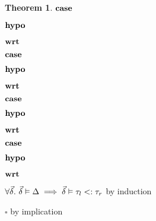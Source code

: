 \documentclass[acmsmall]{acmart}
\theoremstyle{definition}
\newtheorem{theorem}{Theorem}[section]
\begin{document}
\begin{theorem}
    \item \Z $\textbf{case } $
    \item \Z $\textbf{hypo } $
    \item \Z $\textbf{wrt } $
      \item \Z\Z {} 

    \item \Z $\textbf{case } $
    \item \Z $\textbf{hypo } $
    \item \Z $\textbf{wrt } $
      \item \Z\Z {} 

    \item \Z $\textbf{case } $
    \item \Z $\textbf{hypo } $
    \item \Z $\textbf{wrt } $

      \item \Z\Z {} 

    \item \Z $\textbf{case } $
    \item \Z $\textbf{hypo } $
    \item \Z $\textbf{wrt } $
      \item \Z\Z {} 

    \item \Z $\forall \vec{\delta} .\ \vec{\delta} \vDash \Delta \implies \vec{\delta} \vDash \tau_l <: \tau_r$ 
    by induction
  \item $\square$ by implication
\end{theorem}
\end{document}
